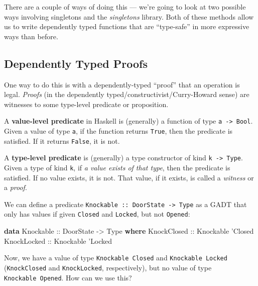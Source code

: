 \documentclass[]{article}
\newenvironment{Shaded}{}{}
\newcommand{\DataTypeTok}[1]{\textcolor[rgb]{0.56,0.13,0.00}{#1}}
\newcommand{\KeywordTok}[1]{\textcolor[rgb]{0.00,0.44,0.13}{\textbf{#1}}}
\newcommand{\NormalTok}[1]{#1}
\newcommand{\OtherTok}[1]{\textcolor[rgb]{0.00,0.44,0.13}{#1}}
\begin{document}
There are a couple of ways of doing this --- we're going to look at two possible
ways involving singletons and the \emph{singletons} library. Both of these
methods allow us to write dependently typed functions that are ``type-safe'' in
more expressive ways than before.

\hypertarget{dependently-typed-proofs}{%
\subsection{Dependently Typed Proofs}\label{dependently-typed-proofs}}

One way to do this is with a dependently-typed ``proof'' that an operation is
legal. \emph{Proofs} (in the dependently typed/constructivist/Curry-Howard
sense) are witnesses to some type-level predicate or proposition.

A \textbf{value-level predicate} in Haskell is (generally) a function of type
\texttt{a\ -\textgreater{}\ Bool}. Given a value of type \texttt{a}, if the
function returns \texttt{True}, then the predicate is satisfied. If it returns
\texttt{False}, it is not.

A \textbf{type-level predicate} is (generally) a type constructor of kind
\texttt{k\ -\textgreater{}\ Type}. Given a type of kind \texttt{k}, if \emph{a
value exists of that type}, then the predicate is satisfied. If no value exists,
it is not. That value, if it exists, is called a \emph{witness} or a
\emph{proof}.

We can define a predicate
\texttt{Knockable\ ::\ DoorState\ -\textgreater{}\ Type} as a GADT that only has
values if given \texttt{\textquotesingle{}Closed} and
\texttt{\textquotesingle{}Locked}, but not \texttt{\textquotesingle{}Opened}:

\begin{Shaded}
\begin{Highlighting}[]
\KeywordTok{data} \DataTypeTok{Knockable}\OtherTok{ ::} \DataTypeTok{DoorState} \OtherTok{->} \DataTypeTok{Type} \KeywordTok{where}
    \DataTypeTok{KnockClosed}\OtherTok{ ::} \DataTypeTok{Knockable}\NormalTok{ '}\DataTypeTok{Closed}
    \DataTypeTok{KnockLocked}\OtherTok{ ::} \DataTypeTok{Knockable}\NormalTok{ '}\DataTypeTok{Locked}
\end{Highlighting}
\end{Shaded}

Now, we have a value of type \texttt{Knockable\ \textquotesingle{}Closed} and
\texttt{Knockable\ \textquotesingle{}Locked} (\texttt{KnockClosed} and
\texttt{KnockLocked}, respectively), but no value of type
\texttt{Knockable\ \textquotesingle{}Opened}. How can we use this?
\end{document}
